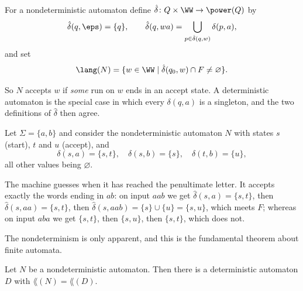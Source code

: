 \begin{definition}
	For a nondeterministic automaton define $\hat\delta \colon Q \times \WW \to \power(Q)$ by
	$$\hat\delta(q, \eps) = \{q\}, \qquad \hat\delta(q, wa) = \bigcup_{p \in \hat\delta(q,w)} \delta(p,a),$$
	and set
	$$\lang(N) = \{w \in \WW \mid \hat\delta(q_0, w) \cap F \neq \varnothing\}.$$
\end{definition}

So $N$ accepts $w$ if \emph{some} run on $w$ ends in an accept state. A deterministic automaton is the special case in which every $\delta(q,a)$ is a singleton, and the two definitions of $\hat\delta$ then agree.

\begin{example}\label{ex:nfaendab}
	Let $\Sigma = \{a,b\}$ and consider the nondeterministic automaton $N$ with states $s$ (start), $t$ and $u$ (accept), and
	$$\delta(s,a) = \{s,t\}, \quad \delta(s,b) = \{s\}, \quad \delta(t,b) = \{u\},$$
	all other values being $\varnothing$.
	\begin{center}
	\end{center}
	The machine guesses when it has reached the penultimate letter. It accepts exactly the words ending in $ab$: on input $aab$ we get $\hat\delta(s,a) = \{s,t\}$, then $\hat\delta(s,aa) = \{s,t\}$, then $\hat\delta(s,aab) = \{s\} \cup \{u\} = \{s,u\}$, which meets $F$; whereas on input $aba$ we get $\{s,t\}$, then $\{s,u\}$, then $\{s,t\}$, which does not.
\end{example}

The nondeterminism is only apparent, and this is the fundamental theorem about finite automata.

\begin{theorem}\label{thm:subset}
	Let $N$ be a nondeterministic automaton. Then there is a deterministic automaton $D$ with $\lang(N) = \lang(D)$.
\end{theorem}

